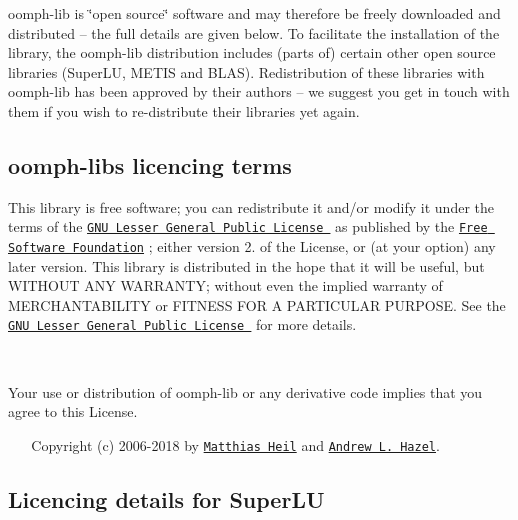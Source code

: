 {\ttfamily oomph-\/lib} is \char`\"{}open source\char`\"{} software and may therefore be freely downloaded and distributed -- the full details are given below. To facilitate the installation of the library, the {\ttfamily oomph-\/lib} distribution includes (parts of) certain other open source libraries (Super\+LU, M\+E\+T\+IS and B\+L\+AS). Redistribution of these libraries with {\ttfamily oomph-\/lib} has been approved by their authors -- we suggest you get in touch with them if you wish to re-\/distribute their libraries yet again.





\subsection*{{\ttfamily oomph-\/lib\textquotesingle{}s} licencing terms}

This library is free software; you can redistribute it and/or modify it under the terms of the \href{http://www.gnu.org/licenses/lgpl.html}{\tt G\+NU Lesser General Public License } as published by the \href{http://www.fsf.org/}{\tt Free Software Foundation} ; either version 2. of the License, or (at your option) any later version. This library is distributed in the hope that it will be useful, but W\+I\+T\+H\+O\+UT A\+NY W\+A\+R\+R\+A\+N\+TY; without even the implied warranty of M\+E\+R\+C\+H\+A\+N\+T\+A\+B\+I\+L\+I\+TY or F\+I\+T\+N\+E\+SS F\+OR A P\+A\+R\+T\+I\+C\+U\+L\+AR P\+U\+R\+P\+O\+SE. See the \href{http://www.gnu.org/licenses/lgpl.html}{\tt G\+NU Lesser General Public License } for more details.

~\newline
 ~\newline


Your use or distribution of {\ttfamily oomph-\/lib} or any derivative code implies that you agree to this License.

~\newline
 ~\newline
 Copyright (c) 2006-\/2018 by \href{http://www.maths.man.ac.uk/~mheil}{\tt Matthias Heil} and \href{http://www.maths.man.ac.uk/~ahazel}{\tt Andrew L. Hazel}.





\subsection*{Licencing details for Super\+LU}

